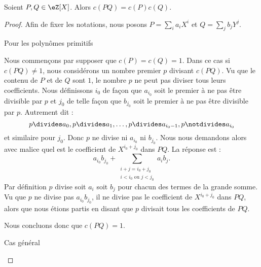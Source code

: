 \begin{lemma}   \label{LemHULrVaF}
    Soient \( P,Q\in \eZ[X]\). Alors \( c(PQ)=c(P)c(Q)\).
\end{lemma}

\begin{proof}
    
    Afin de fixer les notations, nous posons \( P=\sum_ia_iX^i\) et \( Q=\sum_jb_jY^j\).
    
    \begin{subproof}
        \item[Pour les polynômes primitifs]
    
            Nous commençons par supposer que \( c(P)=c(Q)=1\). Dans ce cas si \( c(PQ)\neq 1\), nous considérons un nombre premier \( p\) divisant \( c(PQ)\). Vu que le contenu de \( P\) et de \( Q\) sont \( 1\), le nombre \( p\) ne peut pas diviser tous leurs coefficients. Nous définissons \( i_0\) de façon que \( a_{i_0}\) soit le premier à ne pas être divisible par \( p\) et \( j_0\) de telle façon que \( b_{j_0}\) soit le premier à ne pas être divisible par \( p\). Autrement dit :
            \begin{equation}
                p\divides a_0,p\divides a_1,\ldots,p\divides a_{i_0-1},p\notdivides a_{i_0}
            \end{equation}
            et similaire pour \( j_0\). Donc \( p\) ne divise ni \( a_{i_0}\) ni \( b_{j_0}\). Nous nous demandons alors avec malice quel est le coefficient de \( X^{i_0+j_0}\) dans \( PQ\). La réponse est :
            \begin{equation}
                a_{i_0}b_{j_0}+\sum_{\substack{i+j=i_0+j_0\\i<i_0\text{ ou }j<j_0}}a_ib_j.
            \end{equation}
            Par définition \( p\) divise soit \( a_i\) soit \( b_j\) pour chacun des termes de la grande somme. Vu que \( p\) ne divise pas \( a_{i_0}b_{j_0}\), il ne divise pas le coefficient de \( X^{i_0+j_0}\) dans \( PQ\), alors que nous étions partis en disant que \( p\) divisait tous les coefficients de \( PQ\).

            Nous concluons donc que \( c(PQ)=1\).

        \item[Cas général]


\end{subproof}
\end{proof}

